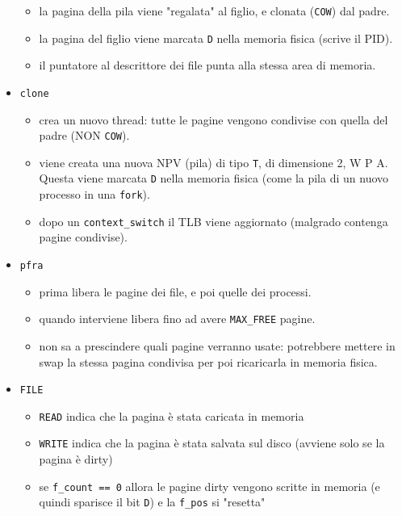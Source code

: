 \documentclass[12pt, a4paper]{report}
\begin{document}
\begin{itemize}
\begin{itemize}
		      \item la pagina della pila viene "regalata" al figlio, e clonata
		            (\texttt{COW}) dal padre.
		      \item la pagina del figlio viene marcata \texttt{D} nella memoria
		            fisica (scrive il PID).
		      \item il puntatore al descrittore dei file punta alla stessa area di
		            memoria.
	      \end{itemize}
	\item \texttt{clone}
	      \begin{itemize}
		      \item crea un nuovo thread: tutte le pagine vengono condivise con
		            quella del padre (NON \texttt{COW}).
		      \item viene creata una nuova NPV (pila) di tipo \texttt{T}, di
		            dimensione 2, W P A. Questa viene marcata \texttt{D} nella
		            memoria fisica (come la pila di un nuovo processo in una
		            \texttt{fork}).
		      \item dopo un \texttt{context\_switch} il TLB viene aggiornato
		            (malgrado contenga pagine condivise).
	      \end{itemize}
	\item \texttt{pfra}
	      \begin{itemize}
		      \item prima libera le pagine dei file, e poi quelle dei processi.
		      \item quando interviene libera fino ad avere \texttt{MAX\_FREE}
		            pagine. \item non sa a prescindere quali pagine verranno
		            usate: potrebbere
		            mettere in swap la stessa pagina condivisa per poi ricaricarla
		            in memoria fisica.
	      \end{itemize}
	\item \texttt{FILE}
	      \begin{itemize}
		      \item \texttt{READ} indica che la pagina è stata caricata in
		            memoria
		      \item \texttt{WRITE} indica che la pagina è stata salvata sul disco
		            (avviene solo se la pagina è dirty)
		      \item se \texttt{f\_count == 0} allora le pagine dirty vengono
		            scritte in memoria (e quindi sparisce il bit \texttt{D}) e la
		            \texttt{f\_pos} si "resetta" \end{itemize}

\end{itemize}
\end{document}
